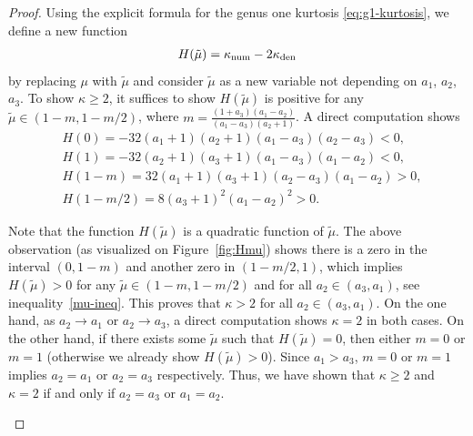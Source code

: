 \documentclass[pdftex]{sigma}
\numberwithin{equation}{section}
\def\ra{\rightarrow}
\begin{document}
\begin{proof}
Using the explicit formula for the genus one kurtosis \eqref{eq:g1-kurtosis}, we define a new function
\begin{align*}
H(\tilde \mu)=\kappa_{\rm num}-2\kappa_{\rm den}
\end{align*}
by replacing $\mu$ with $\tilde \mu$ and consider $\tilde \mu$ as a new variable not depending on $a_1$, $a_2$, $a_3$. To show $\kappa\geq 2$, it suffices to show $H(\tilde \mu)$ is positive for any $\tilde \mu\in (1-m,1-m/2)$, where $m=\frac{(1+a_3)(a_1-a_2)}{(a_1-a_3)(a_2+1)}$. A direct computation shows
\begin{align*}
&H(0)=-32(a_1+1)(a_2+1)(a_1-a_3)(a_2-a_3)<0,\\
&H(1)=-32(a_2+1)(a_3+1)(a_1-a_3)(a_1-a_2)<0,\\
&H(1-m)=32(a_1+1)(a_3+1)(a_2-a_3)(a_1-a_2)>0,\\
&H(1-m/2)=8(a_3+1)^2(a_1-a_2)^2>0.
\end{align*}


Note that the function $H(\tilde \mu)$ is a quadratic function of $\tilde \mu$. The above observation (as visualized on Figure~\ref{fig:Hmu}) shows there is a zero in the interval $(0,1-m)$ and another zero in $(1-m/2,1)$, which implies $H(\tilde \mu)>0$
for any $\tilde \mu \in (1-m,1-m/2)$ and for all $a_2\in (a_3,a_1)$,
see inequality~\eqref{mu-ineq}.
This proves that $\kappa>2$ for all $a_2\in (a_3,a_1)$. On the one hand, as $a_2\ra a_1$ or $a_2\ra a_3$, a direct computation shows $\kappa=2$
in both cases.
On the other hand, if there exists some $\tilde \mu$ such that $H(\tilde \mu)=0$, then either $m=0$ or $m=1$ (otherwise we already show $H(\tilde \mu)>0$). Since $a_1>a_3$, $m=0$ or $m=1$ implies $a_2=a_1$ or $a_2=a_3$ respectively. Thus, we have shown that $\kappa\geq 2$ and $\kappa=2$ if and only if $a_2=a_3$ or $a_1=a_2$.

\begin{figure}[ht]
    \centering
\end{figure}
\end{proof}
\end{document}
